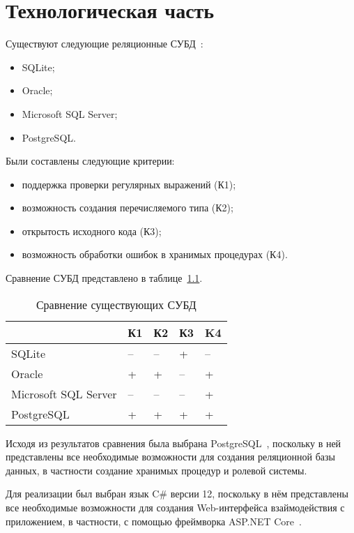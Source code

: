 \chapter{Технологическая часть}

Существуют следующие реляционные СУБД~\cite{dbanalyse}:
\begin{itemize}
	\item SQLite;
	\item Oracle;
	\item Microsoft SQL Server;
	\item PostgreSQL. 
\end{itemize}
Были составлены следующие критерии:
\begin{itemize}
	\item поддержка проверки регулярных выражений (К1);
	\item возможность создания перечисляемого типа (К2);
	\item открытость исходного кода (К3);
	\item возможность обработки ошибок в хранимых процедурах (К4).
\end{itemize}
Сравнение СУБД представлено в таблице~\ref{tbl:dbms_compr}. 
\begin{table}[h!]
	\centering
	\caption{\label{tbl:dbms_compr}Сравнение существующих СУБД}
	\begin{tabular}{|l|l|l|l|l|}
		\hline
		& К1 & К2 & К3 & K4\\\hline
		SQLite & -- & -- & + & --\\\hline
	 	Oracle & + & + & -- & + \\\hline
		Microsoft SQL Server & -- & -- & -- & +\\\hline
		PostgreSQL & + & + & + & + \\\hline
	\end{tabular}
\end{table}

Исходя из результатов сравнения была выбрана PostgreSQL~\cite{postgresql}, поскольку в ней представлены все необходимые возможности для создания реляционной базы данных, в частности создание хранимых процедур и ролевой системы.

Для реализации был выбран язык C\# версии 12, поскольку в нём представлены все необходимые возможности для создания Web-интерфейса взаймодействия с приложением, в частности, с помощью фреймворка ASP.NET Core~\cite{aspnet}.


